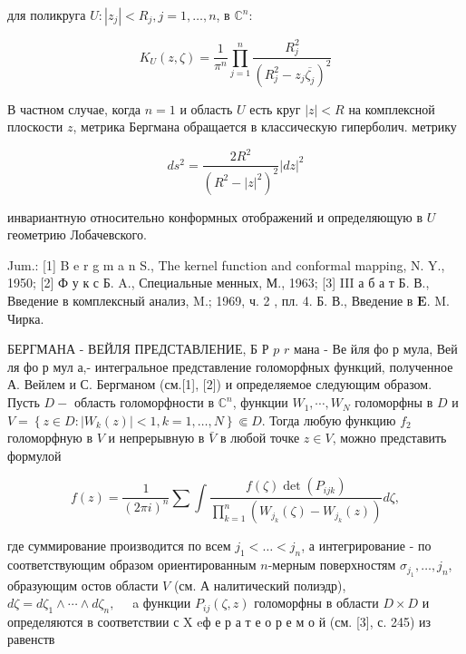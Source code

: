 \documentclass[10pt]{article}
\begin{document}
для поликруга $U:\left|z_{j}\right|<R_{j}, j=1, \ldots, n$, в $\mathbb{C}^{n}:$



\[

K_{U}(z, \zeta)=\frac{1}{\pi^{n}} \prod_{j=1}^{n} \frac{R_{j}^{2}}{\left(R_{j}^{2}-z_{j} \overline{\zeta_{j}}\right)^{2}}

\]



В частном случае, когда $n=1$ и область $U$ есть круг $|z|<R$ на комплексной плоскости $z$, метрика Бергмана обращается в классическую гиперболич. метрику



\[

d s^{2}=\frac{2 R^{2}}{\left(R^{2}-|z|^{2}\right)^{2}}|d z|^{2}

\]



инвариантную относительно конформных отображений и определяющую в $U$ геометрию Лобачевского.



Jum.: [1] B e r g m a n S., The kernel function and conformal mapping, N. Y., 1950; [2] Ф у к с Б. A., Специальные менных, М., 1963; [3] III а б а т Б. В., Введение в комплексный анализ, M.; 1969, ч. 2 , пл. 4. Б. В., Введение в $\boldsymbol{E}$. M. Чирка.



БЕРГМАНА - ВЕЙЛЯ ПРЕДСТАВЛЕНИЕ, Б Р $p$ $r$ мана - Ве йля фо р мула, Вей ля фо р мул а,- интегральное представление голоморфных функций, полученное А. Вейлем и С. Бергманом (см.[1], [2]) и определяемое следующим образом. Пусть $D-$ область голоморфности в $\mathbb{C}^{n}$, функции $W_{1}, \cdots, W_{N}$ голоморфны в $D$ и $V=\left\{z \in D:\left|W_{k}(z)\right|<1, k=1, \ldots, N\right\} \Subset D$. Тогда любую функцию $f_{2}$ голоморфную в $V$ и непрерывную в $\bar{V}$ в любой точке $z \in V$, можно представить формулой



\[

f(z)=\frac{1}{(2 \pi i)^{n}} \sum \int \frac{f(\zeta) \operatorname{det}\left(P_{i j k}\right)}{\prod_{k=1}^{n}\left(W_{j_{k}}(\zeta)-W_{j_{k}}(z)\right)} d \zeta,

\]



где суммирование производится по всем $j_{1}<\ldots<j_{n}$, а интегрирование - по соответствующим образом ориентированным $n$-мерным поверхностям $\sigma_{j_{1}}, \ldots, j_{n}$, образующим остов области $V$ (см. А налитический полиэдр), $d \zeta=d \zeta_{1} \wedge \cdots \wedge d \zeta_{n}, \quad$ a функции $P_{i j}(\zeta, z)$ голоморфны в области $D \times D$ и определяются в соответствии с $\mathrm{X}$ eф е р а т е о р е м о й (см. [3], с. 245) из равенств
\end{document}
